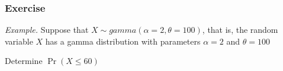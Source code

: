 \documentclass{beamer}
\begin{document}
\begin{frame}[shrink=2]
\frametitle{Exercise} \emph{Example.} Suppose that $X \sim
gamma(\alpha=2, \theta=100)$, that is, the random variable $X$ has a
gamma distribution with parameters $\alpha=2$ and  $\theta=100$
\vspace{2mm}

Determine $\Pr(X \le 60)$

\end{frame}



\end{document}
